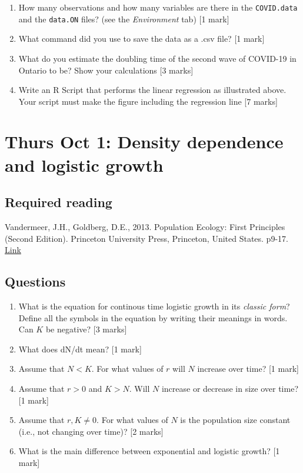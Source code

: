\documentclass[]{book}
\begin{document}
\begin{enumerate}
\def\labelenumi{\arabic{enumi}.}
\item
  How many observations and how many variables are there in the
  \texttt{COVID.data} and the \texttt{data.ON} files? (see the
  \emph{Environment} tab) {[}1 mark{]}
\item
  What command did you use to save the data as a .csv file? {[}1 mark{]}
\item
  What do you estimate the doubling time of the second wave of COVID-19
  in Ontario to be? Show your calculations {[}3 marks{]}
\item
  Write an R Script that performs the linear regression as illustrated
  above. Your script must make the figure including the regression line
  {[}7 marks{]}
\end{enumerate}

\chapter{Thurs Oct 1: Density dependence and logistic
growth}\label{thurs-oct-1-density-dependence-and-logistic-growth}

\section{Required reading}\label{required-reading-3}

Vandermeer, J.H., Goldberg, D.E., 2013. Population Ecology: First
Principles (Second Edition). Princeton University Press, Princeton,
United States. p9-17.
\href{https://ebookcentral-proquest-com.qe2a-proxy.mun.ca/lib/mun/detail.action?docID=1205619}{Link}

\section{Questions}\label{questions-8}

\begin{enumerate}
\def\labelenumi{\arabic{enumi}.}
\item
  What is the equation for continous time logistic growth in its
  \emph{classic form}? Define all the symbols in the equation by writing
  their meanings in words. Can \(K\) be negative? {[}3 marks{]}
\item
  What does dN/dt mean? {[}1 mark{]}
\item
  Assume that \(N < K\). For what values of \(r\) will \(N\) increase
  over time? {[}1 mark{]}
\item
  Assume that \(r > 0\) and \(K > N\). Will \(N\) increase or decrease
  in size over time? {[}1 mark{]}
\item
  Assume that \(r,K \neq 0\). For what values of \(N\) is the population
  size constant (i.e., not changing over time)? {[}2 marks{]}
\item
  What is the main difference between exponential and logistic growth?
  {[}1 mark{]}
\end{enumerate}
\end{document}
